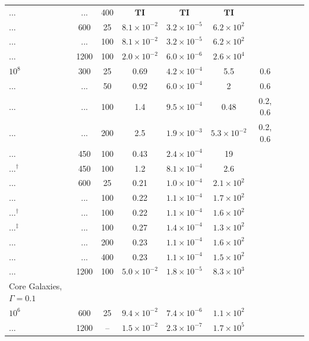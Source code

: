 \documentclass[usenatbib,fleqn]{mn2e}
\begin{document}
\begin{table}
\begin{threeparttable}
\begin{minipage}{18cm}
\begin{tabular}{lccccccccc}
... & ... & 400 & $\mathbf{TI}$ & $\mathbf{TI}$ & $\mathbf{TI}$ \\
... & 600 & 25 & $ 8.1 \times 10^{ -2 }$ & $ 3.2 \times 10^{ -5 }$ & $ 6.2 \times 10^{ 2 }$ \\
... & ... & 100 & $ 8.1 \times 10^{ -2 }$ & $ 3.2 \times 10^{ -5 }$ & $ 6.2 \times 10^{ 2 }$ \\
... & 1200 & 100 & $ 2.0 \times 10^{ -2 }$ & $ 6.0 \times 10^{ -6 }$ & $ 2.6 \times 10^{ 4 }$ \\
$    10^{ 8 }$ & 300 & 25 & 0.69 & $ 4.2 \times 10^{ -4 }$ & 5.5 & 0.6\\
... & ... & 50 & 0.92 & $ 6.0 \times 10^{ -4 }$ & 2 & 0.6\\
 ... & ... & 100 & 1.4 & $ 9.5 \times 10^{ -4 }$ & 0.48 & 0.2, 0.6 \\
 ... & ... & 200 & 2.5 & $ 1.9 \times 10^{ -3 }$ & $5.3 \times  10^{
   -2 }$ & 0.2, 0.6  \\
... & 450 & 100 & 0.43 & $ 2.4 \times 10^{ -4 }$ & 19 \\
...$^{\dagger}$ & 450 & 100 & 1.2 & $ 8.1 \times 10^{ -4 }$ & 2.6 \\
... & 600 & 25 & 0.21 & $ 1.0 \times 10^{ -4 }$ & $ 2.1 \times 10^{ 2 }$ \\
... & ... & 100 & 0.22 & $ 1.1 \times 10^{ -4 }$ & $ 1.7 \times 10^{ 2
}$ \\
...$^{\dagger}$ & ... & 100 & 0.22 & $ 1.1 \times 10^{ -4 }$ & $ 1.6 \times 10^{ 2 }$ \\
...$^{\ddagger}$  & ... & 100 & 0.27 & $ 1.4 \times 10^{ -4 }$ & $ 1.3 \times 10^{ 2
}$ \\
... & ... & 200 & 0.23 & $ 1.1 \times 10^{ -4 }$ & $ 1.6 \times 10^{ 2 }$ \\
... & ... & 400 & 0.23 & $ 1.1 \times 10^{ -4 }$ & $ 1.5 \times 10^{ 2 }$ \\
... & 1200 & 100 & $ 5.0 \times 10^{ -2 }$ & $ 1.8 \times 10^{ -5 }$ & $ 8.3 \times 10^{ 3 }$ \\
\hline
Core Galaxies, $\Gamma = 0.1$  &  & & & & & & & & \\
$    10^{ 6 }$ & 600 & 25 & $ 9.4 \times 10^{ -2 }$ & $ 7.4 \times 10^{ -6 }$ & $ 1.1 \times 10^{ 2 }$ \\
... & 1200 & -- & $ 1.5 \times 10^{ -2 }$ & $ 2.3 \times 10^{ -7 }$ & $ 1.7 \times 10^{ 5 }$ \\

\end{tabular}
\end{minipage}
\end{threeparttable}
\end{table}
\end{document}

